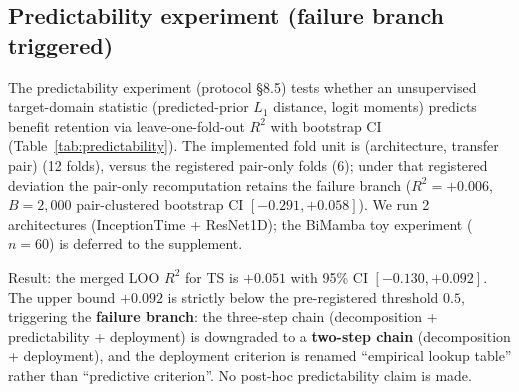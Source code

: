 \documentclass[final,5p,times,nonatbib]{elsarticle}
\begin{document}
\subsection{Predictability experiment (failure branch triggered)}
\label{sec:predictability}
The predictability experiment (protocol \S8.5) tests whether an
unsupervised target-domain statistic (predicted-prior $L_1$ distance,
logit moments) predicts benefit retention via leave-one-fold-out
$R^2$ with bootstrap CI (Table~\ref{tab:predictability}). The
implemented fold unit is (architecture, transfer pair) (12 folds),
versus the registered pair-only folds (6); under that registered
deviation the pair-only recomputation retains the failure branch
($R^2=+0.006$, $B{=}2{,}000$ pair-clustered bootstrap CI
$[-0.291, +0.058]$). We run 2 architectures (InceptionTime + ResNet1D);
the BiMamba toy experiment ($n=60$) is deferred to the supplement.

Result: the merged LOO $R^2$ for TS is $+0.051$ with 95\% CI
$[-0.130, +0.092]$. The upper bound $+0.092$ is strictly below the
pre-registered threshold $0.5$, triggering the \textbf{failure
branch}: the three-step chain (decomposition + predictability +
deployment) is downgraded to a \textbf{two-step chain} (decomposition
+ deployment), and the deployment criterion is renamed ``empirical
lookup table'' rather than ``predictive criterion''. No post-hoc
predictability claim is made.
\end{document}
